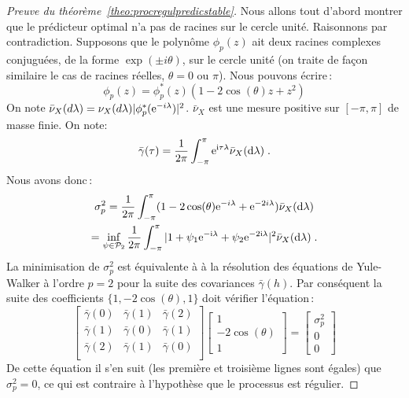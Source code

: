 \begin{proof}[Preuve du th\'eor\`eme~\ref{theo:procregulpredicstable}]

Nous allons tout d'abord montrer que le pr\'edicteur optimal n'a pas
de racines sur le cercle unit\'e. Raisonnons par contradiction.
Supposons que le polyn\^ome $\phi_p(z)$ ait deux racines
complexes conjugu\'ees, de la forme $\exp(\pm i\theta)$, sur le
cercle unit\'e (on traite de fa\c{c}on similaire le cas de racines
r\'eelles, $\theta= 0$ ou $\pi$). Nous pouvons \'ecrire\,:
\[
 \phi_p(z) = \phi^*_p(z) (1 - 2 \cos(\theta) z + z^2)
\]
On note $\bar{\nu}_X(d \lambda) = \nu_X(d \lambda) |\phi^*_p(\mathrm{e}^{-i
\lambda})|^2$. $\bar{\nu}_X$ est une mesure positive sur
$[-\pi,\pi]$ de masse finie. On note:
\[
 \bar{\gamma}(\tau) = \frac{1}{2 \pi} \int_{- \pi}^{\pi}
 \mathrm{e}^{\mathrm{i} \tau \lambda} \bar{\nu}_X(\mathrm{d} \lambda)\;.
\]
Nous avons donc\,:
\begin{multline*}
 \sigma_p^2 = \frac{1}{2 \pi} \int_{-\pi}^\pi
                  (1 - 2 \cos(\theta) \mathrm{e}^{-i \lambda} + \mathrm{e}^{-2 i \lambda})
                  \bar{\nu}_X(\mathrm{d} \lambda)\\
           = \inf_{\psi \in \mathcal{P}_2} \frac{1}{2 \pi}
           \int_{-\pi}^\pi
           |1 + \psi_1 \mathrm{e}^{-\mathrm{i}\lambda} + \psi_2 \mathrm{e}^{-2 \mathrm{i} \lambda}|^2
             \bar{\nu}_X(\mathrm{d} \lambda) \;.
\end{multline*}
La minimisation de $\sigma_p^2$ est équivalente à
\`a la r\'esolution des \'equations de Yule-Walker \`a
l'ordre $p=2$ pour la suite des covariances $\bar{\gamma}(h)$.
Par cons\'equent la suite des coefficients $\{1,-2\cos(\theta),1\}$
doit v\'erifier l'\'equation\,:
\[
\left[
\begin{array}{ccc}
\bar{\gamma}(0) & \bar{\gamma}(1) & \bar{\gamma}(2) \\
\bar{\gamma}(1) & \bar{\gamma}(0) & \bar{\gamma}(1) \\
\bar{\gamma}(2) & \bar{\gamma}(1) & \bar{\gamma}(0) \\
\end{array}
\right] \left[
\begin{array}{c}
1 \\
-2 \cos(\theta) \\
1
\end{array}
\right] = \left[
\begin{array}{c}
\sigma_p^2 \\
0 \\
0
\end{array}
\right]
\]
De cette \'equation il s'en suit (les premi\`ere et troisi\`eme
lignes sont \'egales) que $\sigma_p^2=0$, ce qui est contraire \`a
l'hypoth\`ese que le processus est r\'egulier.


\end{proof}
